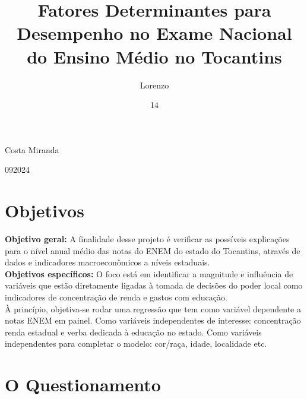 \documentclass[tcc1,project]{uftex}
\begin{document}
  \title{Fatores Determinantes para Desempenho no Exame Nacional do Ensino Médio no Tocantins}
  \author{Lorenzo}{Costa Miranda}

  \date{14}{09}{2024}

  

  \maketitle

  \begin{abstract}


 \end{abstract}


\section*{Objetivos}

\textbf{Objetivo geral:} A finalidade desse projeto é verificar as possíveis explicações para o nível anual médio das notas do ENEM do estado do Tocantins, através de dados e indicadores macroeconômicos a níveis estaduais.\\

\textbf{Objetivos específicos:} O foco está em identificar a magnitude e influência de variáveis que estão diretamente ligadas à tomada de decisões do poder local como indicadores de concentração de renda e gastos com educação. \\

À princípio, objetiva-se rodar uma regressão que tem como variável dependente a notas ENEM em painel. Como variáveis independentes de interesse: concentração renda estadual e verba dedicada à educação no estado. Como variáveis independentes para completar o modelo: cor/raça, idade, localidade etc. 

\section*{O Questionamento}
\end{document}
